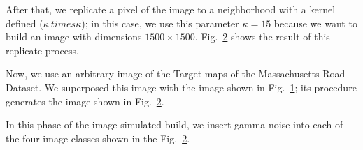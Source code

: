 \documentclass[
  journal,
]{IEEEtran}%
\begin{document}
After that, we replicate a pixel of the image to a neighborhood with a
kernel defined (\(\kappa \ times \kappa\)); in this case, we use this
parameter \(\kappa = 15\) because we want to build an image with
dimensions \(1500\times 1500\). Fig.~\ref{fig-4} shows the result of
this replicate process.

\begin{figure}


\caption{\label{fig-3}}

\end{figure}%

Now, we use an arbitrary image of the Target maps of the Massachusetts
Road Dataset. We superposed this image with the image shown in
Fig.~\ref{fig-3}; its procedure generates the image shown in
Fig.~\ref{fig-4}.

\begin{figure}


\caption{\label{fig-4}}

\end{figure}%

In this phase of the image simulated build, we insert gamma noise into
each of the four image classes shown in the Fig.~\ref{fig-4}.
\end{document}
